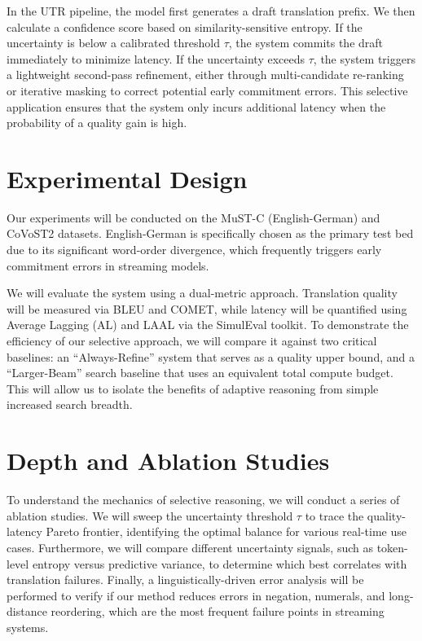 In the UTR pipeline, the model first generates a draft translation prefix. We then calculate a confidence score based on similarity-sensitive entropy. If the uncertainty is below a calibrated threshold $\tau$, the system commits the draft immediately to minimize latency. If the uncertainty exceeds $\tau$, the system triggers a lightweight second-pass refinement, either through multi-candidate re-ranking or iterative masking to correct potential early commitment errors. This selective application ensures that the system only incurs additional latency when the probability of a quality gain is high.

\section{Experimental Design}
Our experiments will be conducted on the MuST-C (English-German) and CoVoST2 datasets. English-German is specifically chosen as the primary test bed due to its significant word-order divergence, which frequently triggers early commitment errors in streaming models.

We will evaluate the system using a dual-metric approach. Translation quality will be measured via BLEU and COMET, while latency will be quantified using Average Lagging (AL) and LAAL via the SimulEval toolkit. To demonstrate the efficiency of our selective approach, we will compare it against two critical baselines: an ``Always-Refine'' system that serves as a quality upper bound, and a ``Larger-Beam'' search baseline that uses an equivalent total compute budget. This will allow us to isolate the benefits of adaptive reasoning from simple increased search breadth.

\section{Depth and Ablation Studies}
To understand the mechanics of selective reasoning, we will conduct a series of ablation studies. We will sweep the uncertainty threshold $\tau$ to trace the quality-latency Pareto frontier, identifying the optimal balance for various real-time use cases. Furthermore, we will compare different uncertainty signals, such as token-level entropy versus predictive variance, to determine which best correlates with translation failures. Finally, a linguistically-driven error analysis will be performed to verify if our method reduces errors in negation, numerals, and long-distance reordering, which are the most frequent failure points in streaming systems.

